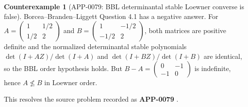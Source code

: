 \documentclass[11pt]{article}
\numberwithin{equation}{section}
\theoremstyle{definition}
\newtheorem{counterexample}[theorem]{Counterexample}
\theoremstyle{remark}
\newcommand{\1}{\mathbf 1}
\begin{document}
\begin{counterexample}[APP-0079: BBL determinantal stable Loewner converse is false]
\label{res:not-bbl-determinantalstable-loewnerconverse}
Borcea--Branden--Liggett Question 4.1 has a negative answer. For \(A=\begin{pmatrix}1&1/2\\1/2&2\end{pmatrix}\) and \(B=\begin{pmatrix}1&-1/2\\-1/2&2\end{pmatrix}\), both matrices are positive definite and the normalized determinantal stable polynomials \(\det(I+AZ)/\det(I+A)\) and \(\det(I+BZ)/\det(I+B)\) are identical, so the BBL order hypothesis holds. But \(B-A=\begin{pmatrix}0&-1\\-1&0\end{pmatrix}\) is indefinite, hence \(A\nleq B\) in Loewner order.



This resolves the source problem recorded as \textbf{APP-0079} \cite{app-app-0079-source}.
\end{counterexample}
\end{document}

